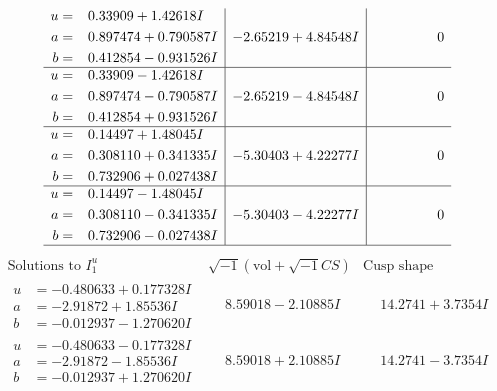 \documentclass[1p]{elsarticle_modified}
\theoremstyle{definition}
\newcommand{\I}{\sqrt{-1}}
\begin{document}
$$\begin{array}{c|c|c}
\begin{aligned}
u &= \phantom{-}0.33909 + 1.42618 I \\
a &= \phantom{-}0.897474 + 0.790587 I \\
b &= \phantom{-}0.412854 - 0.931526 I\end{aligned}
 & -2.65219 + 4.84548 I & \phantom{-0.000000 } 0 \\ \hline\begin{aligned}
u &= \phantom{-}0.33909 - 1.42618 I \\
a &= \phantom{-}0.897474 - 0.790587 I \\
b &= \phantom{-}0.412854 + 0.931526 I\end{aligned}
 & -2.65219 - 4.84548 I & \phantom{-0.000000 } 0 \\ \hline\begin{aligned}
u &= \phantom{-}0.14497 + 1.48045 I \\
a &= \phantom{-}0.308110 + 0.341335 I \\
b &= \phantom{-}0.732906 + 0.027438 I\end{aligned}
 & -5.30403 + 4.22277 I & \phantom{-0.000000 } 0 \\ \hline\begin{aligned}
u &= \phantom{-}0.14497 - 1.48045 I \\
a &= \phantom{-}0.308110 - 0.341335 I \\
b &= \phantom{-}0.732906 - 0.027438 I\end{aligned}
 & -5.30403 - 4.22277 I & \phantom{-0.000000 } 0\\
 \hline 
 \end{array}$$\newpage$$\begin{array}{c|c|c}  
\text{Solutions to }I^u_{1}& \I (\text{vol} + \sqrt{-1}CS) & \text{Cusp shape}\\
 \hline 
\begin{aligned}
u &= -0.480633 + 0.177328 I \\
a &= -2.91872 + 1.85536 I \\
b &= -0.012937 - 1.270620 I\end{aligned}
 & \phantom{-}8.59018 - 2.10885 I & \phantom{-}14.2741 + 3.7354 I \\ \hline\begin{aligned}
u &= -0.480633 - 0.177328 I \\
a &= -2.91872 - 1.85536 I \\
b &= -0.012937 + 1.270620 I\end{aligned}
 & \phantom{-}8.59018 + 2.10885 I & \phantom{-}14.2741 - 3.7354 I \\ \hline\begin{aligned}

\end{aligned}
\end{array}$$
\end{document}
